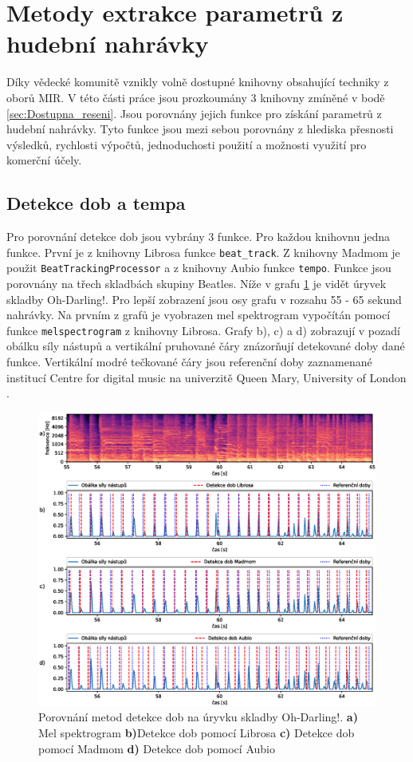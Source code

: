 \section{Metody extrakce parametrů z hudební nahrávky} \label{sec:Exktrakce_vlastnosti_metody}
Díky vědecké komunitě vznikly volně dostupné knihovny obsahující techniky z oborů \acs{MIR}. V této části práce jsou prozkoumány 3 knihovny zmíněné v bodě \ref{sec:Dostupna_reseni}. Jsou porovnány jejich funkce pro získání parametrů z hudební nahrávky. Tyto funkce jsou mezi sebou porovnány z hlediska přesnosti výsledků, rychlosti výpočtů, jednoduchosti použití a možnosti využití pro komerční účely. 

\subsection{Detekce dob a tempa}
Pro porovnání detekce dob jsou vybrány 3 funkce. Pro každou knihovnu jedna funkce. První je z knihovny Librosa funkce \texttt{beat\_track}. Z knihovny Madmom je použit \texttt{BeatTrackingProcessor} a z knihovny Aubio funkce \texttt{tempo}. Funkce jsou porovnány na třech skladbách skupiny Beatles. Níže v grafu \ref{fig:Oh-Darling_beat_analysis} je vidět úryvek skladby Oh-Darling!. Pro lepší zobrazení jsou osy grafu v rozsahu 55 - 65 sekund nahrávky. Na prvním z grafů je vyobrazen mel spektrogram vypočítán pomocí funkce \texttt{melspectrogram} z knihovny Librosa. Grafy b), c) a d) zobrazují v pozadí obálku síly nástupů a vertikální pruhované čáry znázorňují detekované doby dané funkce. Vertikální modré tečkované čáry jsou referenční doby zaznamenané institucí Centre for digital music na univerzitě Queen Mary, University of London \cite{Isophonic}. 

\begin{figure}[H]
    \centering
    \includegraphics[width = 1\linewidth]{obrazky/Oh-Darling_Beat_analysis_graphs.eps}
    \caption{Porovnání metod detekce dob na úryvku skladby Oh-Darling!. \textbf{a)} Mel spektrogram \textbf{b)}Detekce dob pomocí Librosa \textbf{c)} Detekce dob pomocí Madmom \textbf{d)} Detekce dob pomocí Aubio}
    \label{fig:Oh-Darling_beat_analysis}
\end{figure}

